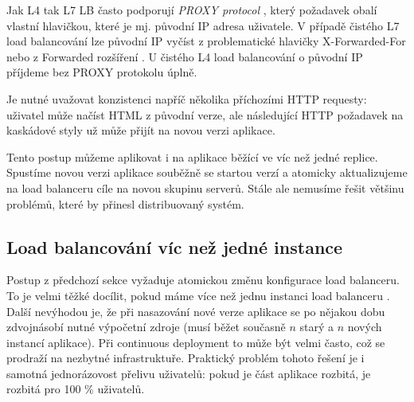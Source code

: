             Jak L4 tak L7 LB často podporují \textit{PROXY protocol} \cite{tarreau-proxyprotocol}, který požadavek obalí vlastní hlavičkou, které je mj. původní IP adresa uživatele. V případě čistého L7 load balancování lze původní IP vyčíst z problematické \cite{hansen-xforwardedfor} hlavičky X-Forwarded-For nebo z Forwarded rozšíření \cite{http-forwarded}. U čistého L4 load balancování o původní IP příjdeme bez PROXY protokolu úplně.

            Je nutné uvažovat konzistenci napříč několika příchozími HTTP requesty: uživatel může načíst HTML z původní verze, ale následující HTTP požadavek na kaskádové styly už může přijít na novou verzi aplikace.

            Tento postup můžeme aplikovat i na aplikace běžící ve víc než jedné replice. Spustíme novou verzi aplikace souběžně se startou verzí a atomicky aktualizujeme na load balanceru cíle na novou skupinu serverů. Stále ale nemusíme řešit většinu problémů, které by přinesl distribuovaný systém.

        \subsection{Load balancování víc než jedné instance}
            Postup z předchozí sekce vyžaduje atomickou změnu konfigurace load balanceru. To je velmi těžké docílit, pokud máme více než jednu instanci load balanceru . Další nevýhodou je, že při nasazování nové verze aplikace se po nějakou dobu zdvojnásobí nutné výpočetní zdroje (musí běžet současně $n$ starý a $n$ nových instancí aplikace). Při continuous deployment to může být velmi často, což se prodraží na nezbytné infrastruktuře. Praktický problém tohoto řešení je i samotná jednorázovost přelivu uživatelů: pokud je část aplikace rozbitá, je rozbitá pro 100 \% uživatelů.

